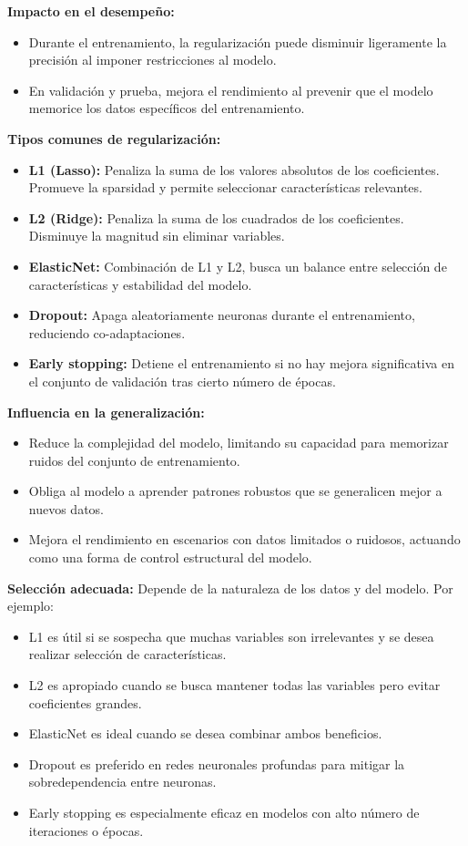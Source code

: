 \documentclass[a4paper,12pt]{article}
\begin{document}
	\textbf{Impacto en el desempeño:}
	\begin{itemize}
		\item Durante el entrenamiento, la regularización puede disminuir ligeramente la precisión al imponer restricciones al modelo.
		\item En validación y prueba, mejora el rendimiento al prevenir que el modelo memorice los datos específicos del entrenamiento.
	\end{itemize}
	
	\textbf{Tipos comunes de regularización:}
	\begin{itemize}
		\item \textbf{L1 (Lasso):} Penaliza la suma de los valores absolutos de los coeficientes. Promueve la sparsidad y permite seleccionar características relevantes.
		\item \textbf{L2 (Ridge):} Penaliza la suma de los cuadrados de los coeficientes. Disminuye la magnitud sin eliminar variables.
		\item \textbf{ElasticNet:} Combinación de L1 y L2, busca un balance entre selección de características y estabilidad del modelo.
		\item \textbf{Dropout:} Apaga aleatoriamente neuronas durante el entrenamiento, reduciendo co-adaptaciones.
		\item \textbf{Early stopping:} Detiene el entrenamiento si no hay mejora significativa en el conjunto de validación tras cierto número de épocas.
	\end{itemize}
	
	\textbf{Influencia en la generalización:}
	\begin{itemize}
		\item Reduce la complejidad del modelo, limitando su capacidad para memorizar ruidos del conjunto de entrenamiento.
		\item Obliga al modelo a aprender patrones robustos que se generalicen mejor a nuevos datos.
		\item Mejora el rendimiento en escenarios con datos limitados o ruidosos, actuando como una forma de control estructural del modelo.
	\end{itemize}
	
	\textbf{Selección adecuada:} Depende de la naturaleza de los datos y del modelo. Por ejemplo:
	\begin{itemize}
		\item L1 es útil si se sospecha que muchas variables son irrelevantes y se desea realizar selección de características.
		\item L2 es apropiado cuando se busca mantener todas las variables pero evitar coeficientes grandes.
		\item ElasticNet es ideal cuando se desea combinar ambos beneficios.
		\item Dropout es preferido en redes neuronales profundas para mitigar la sobredependencia entre neuronas.
		\item Early stopping es especialmente eficaz en modelos con alto número de iteraciones o épocas.
	\end{itemize}
	
\end{document}
